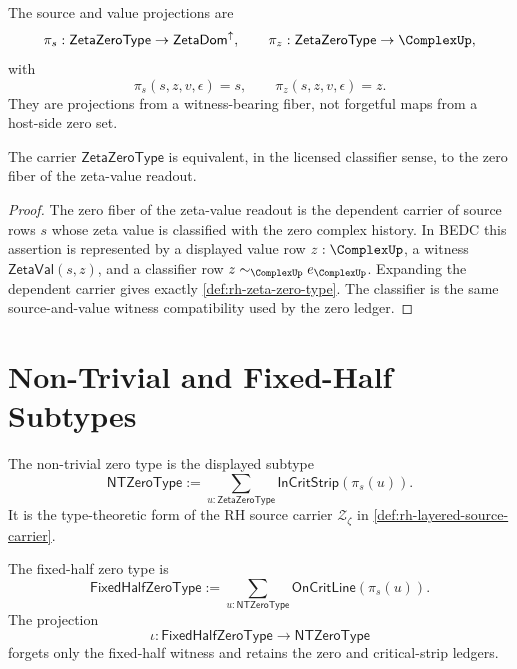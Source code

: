 \begin{definition}
\label{def:rh-zeta-zero-type-projections}
The source and value projections are
$$
\pi_s:\mathsf{ZetaZeroType}\to\mathsf{ZetaDom}^{\uparrow},
\qquad
\pi_z:\mathsf{ZetaZeroType}\to\ComplexUp,
$$
with
$$
\pi_s(s,z,v,\epsilon)=s,
\qquad
\pi_z(s,z,v,\epsilon)=z.
$$
They are projections from a witness-bearing fiber, not forgetful maps from
a host-side zero set.
\end{definition}

\begin{theorem}
\label{thm:rh-zeta-zero-type-zero-fiber}
The carrier $\mathsf{ZetaZeroType}$ is equivalent, in the licensed
classifier sense, to the zero fiber of the zeta-value readout.
\end{theorem}

\begin{proof}
The zero fiber of the zeta-value readout is the dependent carrier of
source rows $s$ whose zeta value is classified with the zero complex
history. In BEDC this assertion is represented by a displayed value row
$z:\ComplexUp$, a witness $\mathsf{ZetaVal}(s,z)$, and a classifier row
$z\sim_{\ComplexUp}e_{\ComplexUp}$. Expanding the dependent carrier gives
exactly \autoref{def:rh-zeta-zero-type}. The classifier is the same
source-and-value witness compatibility used by the zero ledger.
\end{proof}

\section{Non-Trivial and Fixed-Half Subtypes}
\label{sec:rh-zeta-zero-type-subtypes}

\begin{definition}
\label{def:rh-zeta-zero-type-nontrivial}
The non-trivial zero type is the displayed subtype
$$
\mathsf{NTZeroType}
:=
\sum_{u:\mathsf{ZetaZeroType}}
\mathsf{InCritStrip}(\pi_s(u)).
$$
It is the type-theoretic form of the RH source carrier
$\mathcal Z_{\zeta}$ in \autoref{def:rh-layered-source-carrier}.
\end{definition}

\begin{definition}
\label{def:rh-zeta-zero-type-fixed-half}
The fixed-half zero type is
$$
\mathsf{FixedHalfZeroType}
:=
\sum_{u:\mathsf{NTZeroType}}
\mathsf{OnCritLine}(\pi_s(u)).
$$
The projection
$$
\iota:\mathsf{FixedHalfZeroType}\to\mathsf{NTZeroType}
$$
forgets only the fixed-half witness and retains the zero and
critical-strip ledgers.
\end{definition}

